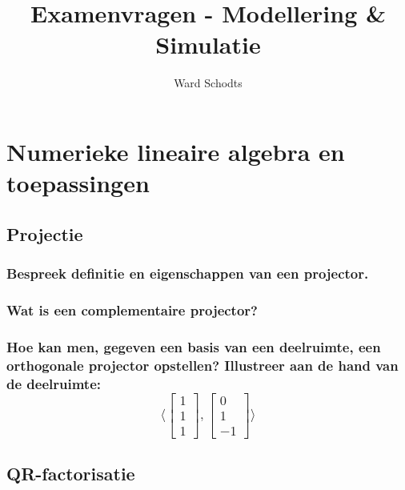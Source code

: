 \documentclass[11pt,a4paper]{article}
\author{Ward Schodts}
\title{Examenvragen - Modellering \& Simulatie}
\begin{document}
\section{Numerieke lineaire algebra en toepassingen}
\subsection{Projectie}
\subsubsection*{Bespreek definitie en eigenschappen van een projector.}

\subsubsection*{Wat is een complementaire projector?}

\subsubsection*{Hoe kan men, gegeven een basis van een deelruimte, een orthogonale projector opstellen? Illustreer aan de hand van de deelruimte: $$ \langle \begin{bmatrix}
1 \\ 1 \\ 1
\end{bmatrix}, 
\begin{bmatrix}
0\\ 1\\ -1
\end{bmatrix} \rangle$$}

\subsection{QR-factorisatie}
\end{document}
